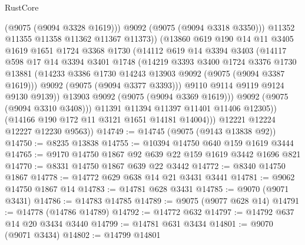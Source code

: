 \begin{lexlean}{RustCore}
\begin{coremodule}
                          (@9075 (@9094 @3328 @1619)))
                        @9092
                        (@9075 (@9094 @3318 @3350)))
                      @11352
                      @11355
                      @11358
                      @11362
                      @11367
                      @11373))
                  (@13860
                    @619
                    @190
                    @14
                    @11
                    @3405
                    @1619
                    @1651
                    @1724
                    @3368
                    @1730
                    (@14112
                      @619
                      @14
                      @3394
                      @3403
                      (@14117
                        @598
                        @17
                        @14
                        @3394
                        @3401
                        @1748
                        (@14219
                          @3393
                          @3400
                          @1724
                          @3376
                          @1730
                          @13881
                          (@14233 @3386 @1730 @14243 @13903 @9092 (@9075 (@9094 @3387 @1619)))
                          @9092
                          (@9075 (@9094 @3377 @3393)))
                        @9110
                        @9114
                        @9119
                        @9124
                        @9130
                        @9139))
                    @13903
                    @9092
                    (@9075 (@9094 @3369 @1619)))
                  @9092
                  (@9075 (@9094 @3310 @3408)))
                @11391
                @11394
                @11397
                @11401
                @11406
                @12305))
            (@14166 @190 @172 @11 @3121 @1651 @14181 @14004)))
        @12221
        @12224
        @12227
        @12230
        @9563))
@14749 := @14745 (@9075 (@9143 @13838 @92))
@14750 := @8235 @13838
@14755 := @10394 @14750 @640 @159 @1619 @3444
@14765 := @9170 @14750 @1867 @92 @639 @22 @159 @1619 @3442 @1696 @821
@14770 := @8331 @14750 @1867 @639 @22 @3442
@14772 := @8340 @14750 @1867
@14778 := @14772 @629 @638 @14 @21 @3431 @3441
@14781 := @9062 @14750 @1867 @14
@14783 := @14781 @628 @3431
@14785 := @9070 (@9071 @3431)
@14786 := @14783 @14785
@14789 := @9075 (@9077 @628 @14)
@14791 := @14778 (@14786 @14789)
@14792 := @14772 @632
@14797 := @14792 @637 @14 @20 @3434 @3440
@14799 := @14781 @631 @3434
@14801 := @9070 (@9071 @3434)
@14802 := @14799 @14801

\end{coremodule}
\end{lexlean}

